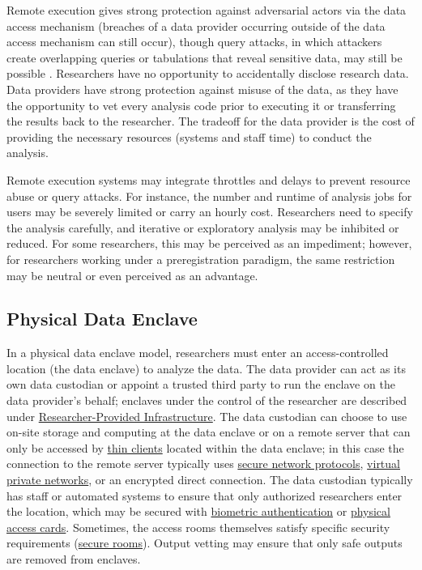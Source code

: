 Remote execution gives strong protection against adversarial actors via the data access mechanism (breaches of a data provider occurring outside of the data access mechanism can still occur), though query attacks, in which attackers create overlapping queries or tabulations that reveal sensitive data, may still be possible \citep{asghar2019}. Researchers have no opportunity to accidentally disclose research data. Data providers have strong protection against misuse of the data, as they have the opportunity to vet every analysis code prior to executing it or transferring the results back to the researcher. The tradeoff for the data provider is the cost of providing the necessary resources (systems and staff time) to conduct the analysis.

Remote execution systems may integrate throttles and delays to prevent resource abuse or query attacks. For instance, the number and runtime of analysis jobs for users may be severely limited or carry an hourly cost. Researchers need to specify the analysis carefully, and iterative or exploratory analysis may be inhibited or reduced. For some researchers, this may be perceived as an impediment; however, for researchers working under a preregistration paradigm, the same restriction may be neutral or even perceived as an advantage.

\hypertarget{physical-data-enclave}{%
\subsection{Physical Data Enclave}\label{physical-data-enclave}}

In a physical data enclave model, researchers must enter an access-controlled location (the data enclave) to analyze the data. The data provider can act as its own data custodian or appoint a trusted third party to run the enclave on the data provider's behalf; enclaves under the control of the researcher are described under \protect\hyperlink{researcher-provided-infrastructure}{Researcher-Provided Infrastructure}. The data custodian can choose to use on-site storage and computing at the data enclave or on a remote server that can only be accessed by \protect\hyperlink{thin-clients}{thin clients} located within the data enclave; in this case the connection to the remote server typically uses \protect\hyperlink{secure-network-protocols}{secure network protocols}, \protect\hyperlink{virtual-private-networks}{virtual private networks}, or an encrypted direct connection. The data custodian typically has staff or automated systems to ensure that only authorized researchers enter the location, which may be secured with \protect\hyperlink{biometric-authentication}{biometric authentication} or \protect\hyperlink{physical-access-cards}{physical access cards}. Sometimes, the access rooms themselves satisfy specific security requirements (\protect\hyperlink{secure-rooms}{secure rooms}). Output vetting may ensure that only safe outputs are removed from enclaves.

